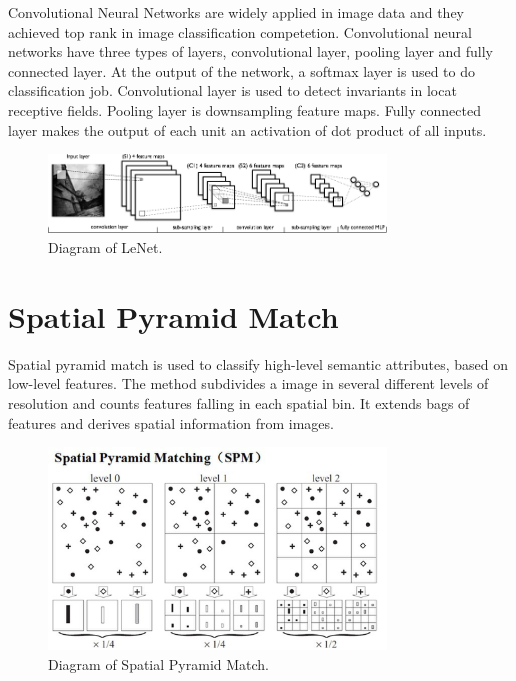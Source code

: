 Convolutional Neural Networks\citep{lecun1998gradient} are widely applied in image data and they achieved top rank in image classification competetion\citep{krizhevsky2012imagenet}. Convolutional neural networks have three types of layers, convolutional layer, pooling layer and fully connected layer. At the output of the network, a softmax layer is used to do classification job.  Convolutional layer is used to detect invariants in locat receptive fields. Pooling layer is downsampling feature maps. Fully connected layer makes the output of each unit an activation of dot product of all inputs.

\graphicspath{ {./Figures/} }
\begin{figure}[!htb]
\centering
\includegraphics[width=0.8\textwidth]{lenet.png}
\caption{\label{fig:perceptron}Diagram of LeNet.}
\end{figure}

\section{Spatial Pyramid Match}

Spatial pyramid match\citep{lazebnik2006beyond} is used to classify high-level semantic attributes, based on low-level features. The method subdivides a image in several different levels of resolution and counts features falling in each spatial bin. It extends bags of features and derives spatial information from images.
\graphicspath{ {./Figures/} }
\begin{figure}[!htb]
\centering
\includegraphics[width=0.8\textwidth]{spm.jpg}
\caption{\label{fig:perceptron}Diagram of Spatial Pyramid Match.}
\end{figure}

